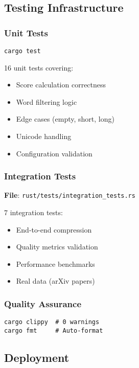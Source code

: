 \subsection{Testing Infrastructure}

\subsubsection{Unit Tests}

\begin{verbatim}
cargo test
\end{verbatim}

16 unit tests covering:
\begin{itemize}
    \item Score calculation correctness
    \item Word filtering logic
    \item Edge cases (empty, short, long)
    \item Unicode handling
    \item Configuration validation
\end{itemize}

\subsubsection{Integration Tests}

\textbf{File}: \texttt{rust/tests/integration\_tests.rs}

7 integration tests:
\begin{itemize}
    \item End-to-end compression
    \item Quality metrics validation
    \item Performance benchmarks
    \item Real data (arXiv papers)
\end{itemize}

\subsubsection{Quality Assurance}

\begin{verbatim}
cargo clippy  # 0 warnings
cargo fmt     # Auto-format
\end{verbatim}

\subsection{Deployment}

